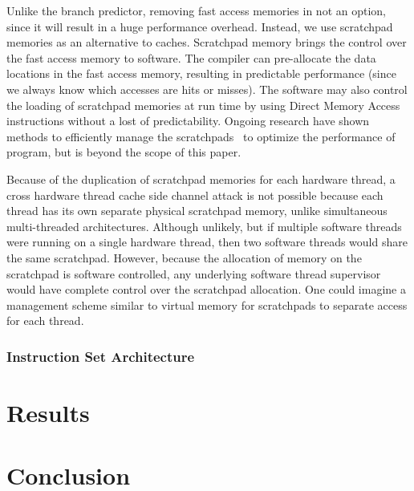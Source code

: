 \documentclass[times, 10pt,twocolumn]{article}
\begin{document}
Unlike the branch predictor, removing fast access memories in not an option, since it will result in a huge performance overhead. Instead, we use scratchpad memories as an alternative to caches. Scratchpad memory brings the control over the fast access memory to software. The compiler can pre-allocate the data locations in the fast access memory, resulting in predictable performance (since we always know which accesses are hits or misses). The software may also control the loading of scratchpad memories at run time by using Direct Memory Access instructions without a lost of predictability. Ongoing research have shown methods to efficiently manage the scratchpads~\cite{avissar2002oma, Bandyopadhyay:EECS-2006-105, Patel:EECS-2008-115} to optimize the performance of program, but is beyond the scope of this paper. 

Because of the duplication of scratchpad memories for each hardware thread, a cross hardware thread cache side channel attack is not possible because each thread has its own separate physical scratchpad memory, unlike simultaneous multi-threaded architectures. Although unlikely, but if multiple software threads were running on a single hardware thread, then two software threads would share the same scratchpad. However, because the allocation of memory on the scratchpad is software controlled, any underlying software thread supervisor would have complete control over the scratchpad allocation. One could imagine a management scheme similar to virtual memory for scratchpads to separate access for each thread. 

\subsubsection {Instruction Set Architecture}

\section{Results}



\section{Conclusion}




\end{document}
